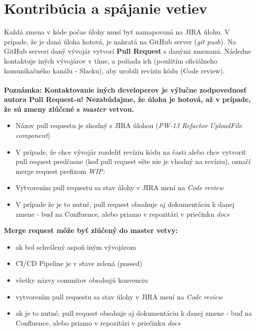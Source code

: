 \documentclass{article}
\begin{document}
    \pagebreak
    \section*{Kontribúcia a spájanie vetiev}

        \textnormal{Každá zmena v kóde počas úlohy musí byť namapovaná na JIRA úlohu. V prípade, že je daná úloha hotová, je nahratá na GitHub server (\emph{git push}). Na GitHub serveri daný vývojár vytvorí \textbf{Pull Request} s danými zmenami. Následne kontaktuje iných vývojárov v tíme, a požiada ich (použitím oficiálneho komunikačného kanálu - Slacku), aby urobili revíziu kódu (Code review).} \\\\
        \textnormal{\textbf{Poznámka: Kontaktovanie iných developerov je výlučne zodpovednosť autora Pull Request-u! Nezabúdajme, že úloha je hotová, až v prípade, že sú zmeny zlúčené s \emph{master} vetvou.}} \\

    \begin{itemize}
        \item Názov pull requestu je zhodný s JIRA úlohou (\emph{PW-13 Refactor UploadFile component})
        \item V prípade, že chce vývojár rozdeliť revíziu kódu na časti alebo chce vytvoriť pull request predčasne (keď pull request ešte nie je vhodný na revíziu), označí merge request prefixom \emph{WIP:}
        \item Vytvorením pull requestu sa stav úlohy v JIRA mení na \emph{Code review}
        \item V prípade že je to nutné, pull request obsahuje aj dokumentáciu k danej zmene - buď na Confluence, alebo priamo v repozitári v priečinku \emph{docs}
    \end{itemize}

    \bigskip

    \textbf{Merge request môže byť zlúčený do master vetvy:}
    \begin{itemize}
        \item ak bol schválený aspoň iným vývojárom
        \item CI/CD Pipeline je v stave zelená (passed)
        \item všetky názvy commitov obsahujú konvenciu
        \item vytvorením pull requestu sa stav úlohy v JIRA mení na \emph{Code review}
        \item ak je to nutné, pull request obsahuje aj dokumentáciu k danej zmene - buď na Confluence, alebo priamo v repozitári v priečinku \emph{docs}
    \end{itemize}
\end{document}
